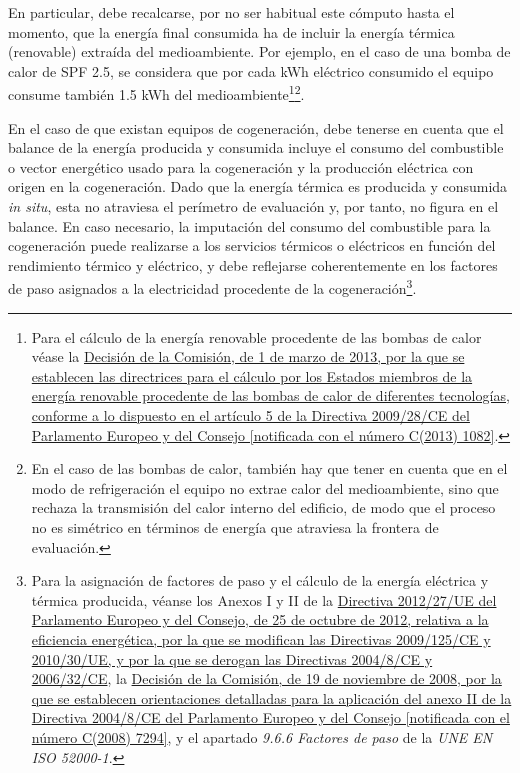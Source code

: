\documentclass[10pt,notitlepage,oneside,a4paper]{article}
\begin{document}
En particular, debe recalcarse, por no ser habitual este cómputo hasta el momento, que la energía final consumida ha de incluir la energía térmica (renovable) extraída del medioambiente. Por ejemplo, en el caso de una bomba de calor de SPF 2.5, se considera que por cada kWh eléctrico consumido el equipo consume también 1.5 kWh del medioambiente\footnote{Para el cálculo de la energía renovable procedente de las bombas de calor véase la \href{https://www.boe.es/doue/2013/062/L00027-00035.pdf}{Decisión de la Comisión, de 1 de marzo de 2013, por la que se establecen las directrices para el cálculo por los Estados miembros de la energía renovable procedente de las bombas de calor de diferentes tecnologías, conforme a lo dispuesto en el artículo 5 de la Directiva 2009/28/CE del Parlamento Europeo y del Consejo [notificada con el número C(2013) 1082]}.}\footnote{En el caso de las bombas de calor, también hay que tener en cuenta que en el modo de refrigeración el equipo no extrae calor del medioambiente, sino que rechaza la transmisión del calor interno del edificio, de modo que el proceso no es simétrico en términos de energía que atraviesa la frontera de evaluación.}.

En el caso de que existan equipos de cogeneración, debe tenerse en cuenta que el balance de la energía producida y consumida incluye el consumo del combustible o vector energético usado para la cogeneración y la producción eléctrica con origen en la cogeneración. Dado que la energía térmica es producida y consumida \textit{in situ}, esta no atraviesa el perímetro de evaluación y, por tanto, no figura en el balance. En caso necesario, la imputación del consumo del combustible para la cogeneración puede realizarse a los servicios térmicos o eléctricos en función del rendimiento térmico y eléctrico, y debe reflejarse coherentemente en los factores de paso asignados a la electricidad procedente de la cogeneración\footnote{Para la asignación de factores de paso y el cálculo de la energía eléctrica y térmica producida, véanse los Anexos I y II de la \href{https://www.boe.es/buscar/doc.php?id=DOUE-L-2012-82191}{Directiva 2012/27/UE del Parlamento Europeo y del Consejo, de 25 de octubre de 2012, relativa a la eficiencia energética, por la que se modifican las Directivas 2009/125/CE y 2010/30/UE, y por la que se derogan las Directivas 2004/8/CE y 2006/32/CE}, la \href{https://www.boe.es/buscar/doc.php?id=DOUE-L-2008-82509}{Decisión de la Comisión, de 19 de noviembre de 2008, por la que se establecen orientaciones detalladas para la aplicación del anexo II de la Directiva 2004/8/CE del Parlamento Europeo y del Consejo [notificada con el número C(2008) 7294]}, y el apartado \textit{9.6.6 Factores de paso} de la \textit{UNE EN ISO 52000-1}.}.
\end{document}
